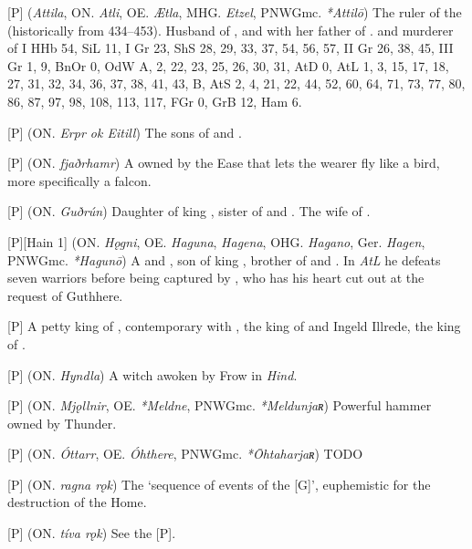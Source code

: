 \begin{itemize}

[P] (\emph{Attila}, ON. \emph{Atli}, OE. \emph{Ætla}, MHG. \emph{Etzel}, PNWGmc. \emph{*Attilō})
  The ruler of the  (historically from 434–453). Husband of , and with her father of . and murderer of
  I HHb 54, SiL 11, I Gr 23, ShS 28, 29, 33, 37, 54, 56, 57, II Gr 26, 38, 45, III Gr 1, 9, BnOr 0, OdW A, 2, 22, 23, 25, 26, 30, 31, AtD 0, AtL 1, 3, 15, 17, 18, 27, 31, 32, 34, 36, 37, 38, 41, 43, B, AtS 2, 4, 21, 22, 44, 52, 60, 64, 71, 73, 77, 80, 86, 87, 97, 98, 108, 113, 117, FGr 0, GrB 12, Ham 6.

[P] (ON. \emph{Erpr ok Eitill})
  The sons of  and .

[P] (ON. \emph{fjaðrhamr})
  A  owned by the Ease that lets the wearer fly like a bird, more specifically a falcon.

[P] (ON. \emph{Guðrún})
  Daughter of king , sister of  and . The wife of .

[P][Hain 1] (ON. \emph{Hǫgni}, OE. \emph{Haguna}, \emph{Hagena}, OHG. \emph{Hagano}, Ger. \emph{Hagen}, PNWGmc. \emph{*Hagunō})
  A  and , son of king , brother of  and . In \emph{AtL} he defeats seven warriors before being captured by , who has his heart cut out at the request of Guthhere.

[P] A petty king of , contemporary with , the king of  and Ingeld Illrede, the  king of .

[P] (ON. \emph{Hyndla}) A witch awoken by Frow in \emph{Hind}.

[P] (ON. \emph{Mjǫllnir}, OE. \emph{*Meldne}, PNWGmc. \emph{*Meldunjaʀ})
  Powerful hammer owned by Thunder.

[P] (ON. \emph{Óttarr}, OE. \emph{Óhthere}, PNWGmc. \emph{*Ōhtaharjaʀ})
  TODO

[P] (ON. \emph{ragna rǫk})
  The ‘sequence of events of the [G]’, euphemistic for the destruction of the Home.

[P] (ON. \emph{tíva rǫk})
  See the [P].


\end{itemize}
